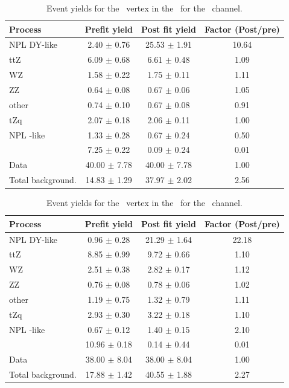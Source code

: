 \begin{table}[htbp]
	\centering
	\caption{Event yields for the \Zct\ vertex in the \TTSR\  for the \eee\ channel. }
	\begin{tabular} {l c c c }
		\toprule
		Process & Prefit yield & Post fit yield & Factor (Post/pre) \\
		\midrule
		NPL DY-like & 2.40 $ \pm $ 0.76 & 25.53 $ \pm $ 1.91 & 10.64 \\ 
		ttZ & 6.09 $ \pm $ 0.68 & 6.61 $ \pm $ 0.48 & 1.09 \\ 
		WZ & 1.58 $ \pm $ 0.22 & 1.75 $ \pm $ 0.11 & 1.11 \\ 
		ZZ & 0.64 $ \pm $ 0.08 & 0.67 $ \pm $ 0.06 & 1.05 \\ 
		other & 0.74 $ \pm $ 0.10 & 0.67 $ \pm $ 0.08 & 0.91 \\ 
		tZq & 2.07 $ \pm $ 0.18 & 2.06 $ \pm $ 0.11 & 1.00 \\ 
		NPL \ttbar-like & 1.33 $ \pm $ 0.28 & 0.67 $ \pm $ 0.24 & 0.50\\
		\kZct  & 7.25 $ \pm $ 0.22 & 0.09 $ \pm $ 0.24 & 0.01\\
		\hdashline
		Data & 40.00 $ \pm $ 7.78 & 40.00 $ \pm $ 7.78 & 1.00\\
		Total background. & 14.83 $ \pm $ 1.29 & 37.97 $ \pm $ 2.02 & 2.56\\
		\bottomrule
	\end{tabular}
\end{table}
\begin{table}[htbp]
	\centering
	\caption{Event yields for the \Zct\ vertex in the \TTSR\  for the \eemu\ channel. }
	\begin{tabular} {l c c c }
		\toprule
		Process & Prefit yield & Post fit yield & Factor (Post/pre) \\
		\midrule
		NPL DY-like & 0.96 $ \pm $ 0.28 & 21.29 $ \pm $ 1.64 & 22.18 \\ 
		ttZ & 8.85 $ \pm $ 0.99 & 9.72 $ \pm $ 0.66 & 1.10 \\ 
		WZ & 2.51 $ \pm $ 0.38 & 2.82 $ \pm $ 0.17 & 1.12 \\ 
		ZZ & 0.76 $ \pm $ 0.08 & 0.78 $ \pm $ 0.06 & 1.02 \\ 
		other & 1.19 $ \pm $ 0.75 & 1.32 $ \pm $ 0.79 & 1.11 \\ 
		tZq & 2.93 $ \pm $ 0.30 & 3.22 $ \pm $ 0.18 & 1.10 \\ 
		NPL \ttbar-like & 0.67 $ \pm $ 0.12 & 1.40 $ \pm $ 0.15 & 2.10\\
		\kZct  & 10.96 $ \pm $ 0.18 & 0.14 $ \pm $ 0.44 & 0.01\\
		\hdashline
		Data & 38.00 $ \pm $ 8.04 & 38.00 $ \pm $ 8.04 & 1.00\\
		Total background. & 17.88 $ \pm $ 1.42 & 40.55 $ \pm $ 1.88 & 2.27\\
		\bottomrule
	\end{tabular}
\end{table}
